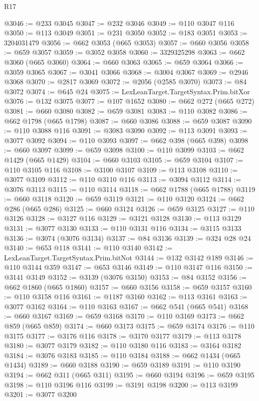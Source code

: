 \begin{lexlean}{R17}
\begin{coremodule}
{{{{{{{{{{{{{{{{{{{{{{{{{{{{{{{{{{{{{{{{{{{{{{{{{{{{{{{{{{{{{{{{{{{{{{{{{{{{{{{{{{{{{@3046 := @233 @3045
@3047 := @232 @3046
@3049 := @110 @3047 @116
@3050 := @113 @3049
@3051 := @231 @3050
@3052 := @183 @3051
@3053 := 3204031479
@3056 := @662 @3053 (@665 @3053)
@3057 := @660 @3056
@3058 := @659 @3057
@3059 := @3052 @3058
@3060 := 3329325298
@3063 := @662 @3060 (@665 @3060)
@3064 := @660 @3063
@3065 := @659 @3064
@3066 := @3059 @3065
@3067 := @3041 @3066
@3068 := @3004 @3067
@3069 := @2946 @3068
@3070 := @2817 @3069
@3072 := @2056 (@2585 @3070)
@3073 := @84 @3072
@3074 := @645 @24
@3075 := LexLeanTarget.TargetSyntax.Prim.bitXor
@3076 := @132 @3075
@3077 := @107 @1652
@3080 := @662 @272 (@665 @272)
@3081 := @660 @3080
@3082 := @659 @3081
@3083 := @110 @3082
@3086 := @662 @1798 (@665 @1798)
@3087 := @660 @3086
@3088 := @659 @3087
@3090 := @110 @3088 @116
@3091 := @3083 @3090
@3092 := @113 @3091
@3093 := @3077 @3092
@3094 := @110 @3093
@3097 := @662 @398 (@665 @398)
@3098 := @660 @3097
@3099 := @659 @3098
@3100 := @110 @3099
@3103 := @662 @1429 (@665 @1429)
@3104 := @660 @3103
@3105 := @659 @3104
@3107 := @110 @3105 @116
@3108 := @3100 @3107
@3109 := @113 @3108
@3110 := @3077 @3109
@3112 := @110 @3110 @116
@3113 := @3094 @3112
@3114 := @3076 @3113
@3115 := @110 @3114
@3118 := @662 @1788 (@665 @1788)
@3119 := @660 @3118
@3120 := @659 @3119
@3121 := @110 @3120
@3124 := @662 @286 (@665 @286)
@3125 := @660 @3124
@3126 := @659 @3125
@3127 := @110 @3126
@3128 := @3127 @116
@3129 := @3121 @3128
@3130 := @113 @3129
@3131 := @3077 @3130
@3133 := @110 @3131 @116
@3134 := @3115 @3133
@3136 := @3074 (@3076 @3134)
@3137 := @84 @3136
@3139 := @324 @28 @24
@3140 := @653 @118
@3141 := @110 @3140
@3142 := LexLeanTarget.TargetSyntax.Prim.bitNot
@3144 := @132 @3142 @189
@3146 := @110 @3144 @359
@3147 := @653 @3146
@3149 := @110 @3147 @116
@3150 := @3141 @3149
@3152 := @3139 (@3076 @3150)
@3153 := @84 @3152
@3156 := @662 @1860 (@665 @1860)
@3157 := @660 @3156
@3158 := @659 @3157
@3160 := @110 @3158 @116
@3161 := @1187 @3160
@3162 := @113 @3161
@3163 := @3077 @3162
@3164 := @110 @3163
@3167 := @662 @541 (@665 @541)
@3168 := @660 @3167
@3169 := @659 @3168
@3170 := @110 @3169
@3173 := @662 @859 (@665 @859)
@3174 := @660 @3173
@3175 := @659 @3174
@3176 := @110 @3175
@3177 := @3176 @116
@3178 := @3170 @3177
@3179 := @113 @3178
@3180 := @3077 @3179
@3182 := @110 @3180 @116
@3183 := @3164 @3182
@3184 := @3076 @3183
@3185 := @110 @3184
@3188 := @662 @1434 (@665 @1434)
@3189 := @660 @3188
@3190 := @659 @3189
@3191 := @110 @3190
@3194 := @662 @311 (@665 @311)
@3195 := @660 @3194
@3196 := @659 @3195
@3198 := @110 @3196 @116
@3199 := @3191 @3198
@3200 := @113 @3199
@3201 := @3077 @3200
}}}}}}}}}}}}}}}}}}}}}}}}}}}}}}}}}}}}}}}}}}}}}}}}}}}}}}}}}}}}}}}}}}}}}}}}}}}}}}}}}}}}}
\end{coremodule}
\end{lexlean}
